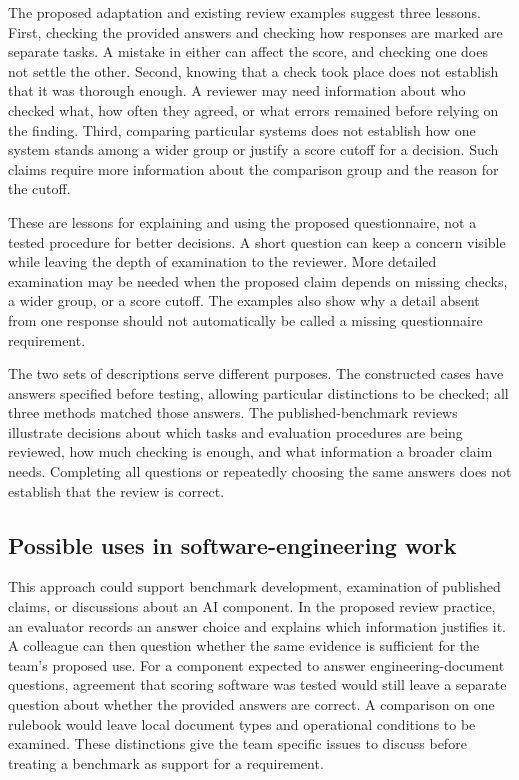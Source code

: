 \documentclass[10pt,conference]{IEEEtran}
\begin{document}
The proposed adaptation and existing review examples suggest three lessons. First, checking the provided answers and checking how responses are marked are separate tasks. A mistake in either can affect the score, and checking one does not settle the other. Second, knowing that a check took place does not establish that it was thorough enough. A reviewer may need information about who checked what, how often they agreed, or what errors remained before relying on the finding. Third, comparing particular systems does not establish how one system stands among a wider group or justify a score cutoff for a decision. Such claims require more information about the comparison group and the reason for the cutoff.

These are lessons for explaining and using the proposed questionnaire, not a tested procedure for better decisions. A short question can keep a concern visible while leaving the depth of examination to the reviewer. More detailed examination may be needed when the proposed claim depends on missing checks, a wider group, or a score cutoff. The examples also show why a detail absent from one response should not automatically be called a missing questionnaire requirement.

The two sets of descriptions serve different purposes. The constructed cases have answers specified before testing, allowing particular distinctions to be checked; all three methods matched those answers. The published-benchmark reviews illustrate decisions about which tasks and evaluation procedures are being reviewed, how much checking is enough, and what information a broader claim needs. Completing all questions or repeatedly choosing the same answers does not establish that the review is correct.

\subsection{Possible uses in software-engineering work}
This approach could support benchmark development, examination of published claims, or discussions about an AI component. In the proposed review practice, an evaluator records an answer choice and explains which information justifies it. A colleague can then question whether the same evidence is sufficient for the team's proposed use. For a component expected to answer engineering-document questions, agreement that scoring software was tested would still leave a separate question about whether the provided answers are correct. A comparison on one rulebook would leave local document types and operational conditions to be examined. These distinctions give the team specific issues to discuss before treating a benchmark as support for a requirement.
\end{document}
